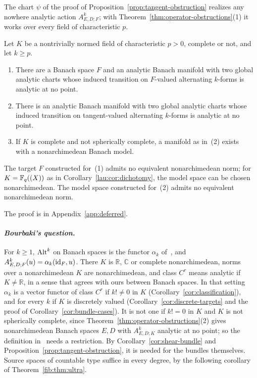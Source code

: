 The chart $\psi$ of the proof of Proposition~\ref{prop:tangent-obstruction} realizes any nowhere analytic action $A^k_{E,D;F}$; with Theorem~\ref{thm:operator-obstructions}(1) it works over every field of characteristic $p$.
\begin{proposition}\label{prop:tangent-values}
Let $K$ be a nontrivially normed field of characteristic $p>0$, complete or not, and let $k\ge p$.
\begin{enumerate}
\item There are a Banach space $F$ and an analytic Banach manifold with two global analytic charts whose induced transition on $F$\nobreakdash-valued alternating $k$\nobreakdash-forms is analytic at no point.
\item There is an analytic Banach manifold with two global analytic charts whose induced transition on tangent-valued alternating $k$\nobreakdash-forms is analytic at no point.
\item If $K$ is complete and not spherically complete, a manifold as in~(2) exists with a nonarchimedean Banach model.
\end{enumerate}
The target $F$ constructed for~(1) admits no equivalent nonarchimedean norm; for $K=\mathbb F_q((X))$ as in Corollary~\ref{lau:cor:dichotomy}, the model space can be chosen nonarchimedean. The model space constructed for~(2) admits no equivalent nonarchimedean norm.
\end{proposition}
The proof is in Appendix~\ref{app:deferred}.

\paragraph{\textit{Bourbaki's question.}}
For $k\ge1$, $\operatorname{Alt}^k$ on Banach spaces is the functor $\alpha_k$ of~\cite[n\textsuperscript{o}~7.8.1]{Bou}, and $A^k_{E,D;F}(u)=\alpha_k(\mathrm{id}_F,u)$. There $K$ is $\mathbb R$, $\mathbb C$ or complete nonarchimedean, norms over a nonarchimedean $K$ are nonarchimedean, and class $C^r$ means analytic if $K\ne\mathbb R$, in a sense that agrees with ours between Banach spaces. In that setting $\alpha_k$ is a vector functor of class $C^r$ if $k!\ne0$ in $K$ (Corollary~\ref{cor:classification}), and for every $k$ if $K$ is discretely valued (Corollary~\ref{cor:discrete-targets} and the proof of Corollary~\ref{cor:bundle-cases}). It is not one if $k!=0$ in $K$ and $K$ is not spherically complete, since Theorem~\ref{thm:operator-obstructions}(2) gives nonarchimedean Banach spaces $E,D$ with $A^k_{E,D;K}$ analytic at no point; so the definition in~\cite[n\textsuperscript{o}~7.8.1]{Bou} needs a restriction. By Corollary~\ref{cor:shear-bundle} and Proposition~\ref{prop:tangent-obstruction}, it is needed for the bundles themselves. Source spaces of countable type suffice in every degree, by the following corollary of Theorem~\ref{fib:thm:ultra}.

